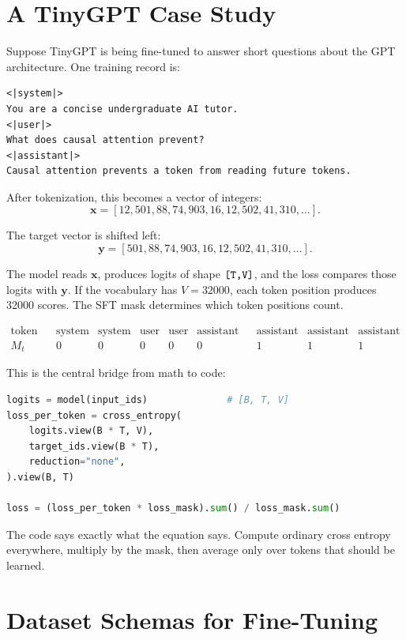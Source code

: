 \section{A TinyGPT Case Study}

Suppose TinyGPT is being fine-tuned to answer short questions about the GPT architecture. One training record is:

\begin{lstlisting}
<|system|>
You are a concise undergraduate AI tutor.
<|user|>
What does causal attention prevent?
<|assistant|>
Causal attention prevents a token from reading future tokens.
\end{lstlisting}

After tokenization, this becomes a vector of integers:
\[
\mathbf{x} =
[12, 501, 88, 74, 903, 16, 12, 502, 41, 310, \ldots].
\]

The target vector is shifted left:
\[
\mathbf{y} =
[501, 88, 74, 903, 16, 12, 502, 41, 310, \ldots].
\]

The model reads \(\mathbf{x}\), produces logits of shape \(\texttt{[T,V]}\), and the loss compares those logits with \(\mathbf{y}\). If the vocabulary has \(V=32000\), each token position produces 32000 scores. The SFT mask determines which token positions count.

\[
\begin{array}{c|cccccccc}
\text{token role} & \text{system} & \text{system} & \text{user} & \text{user} & \text{assistant tag} & \text{assistant} & \text{assistant} & \text{assistant}\\
\hline
M_t & 0 & 0 & 0 & 0 & 0 & 1 & 1 & 1
\end{array}
\]

This is the central bridge from math to code:

\begin{lstlisting}[language=Python]
logits = model(input_ids)              # [B, T, V]
loss_per_token = cross_entropy(
    logits.view(B * T, V),
    target_ids.view(B * T),
    reduction="none",
).view(B, T)

loss = (loss_per_token * loss_mask).sum() / loss_mask.sum()
\end{lstlisting}

The code says exactly what the equation says. Compute ordinary cross entropy everywhere, multiply by the mask, then average only over tokens that should be learned.

\section{Dataset Schemas for Fine-Tuning}

